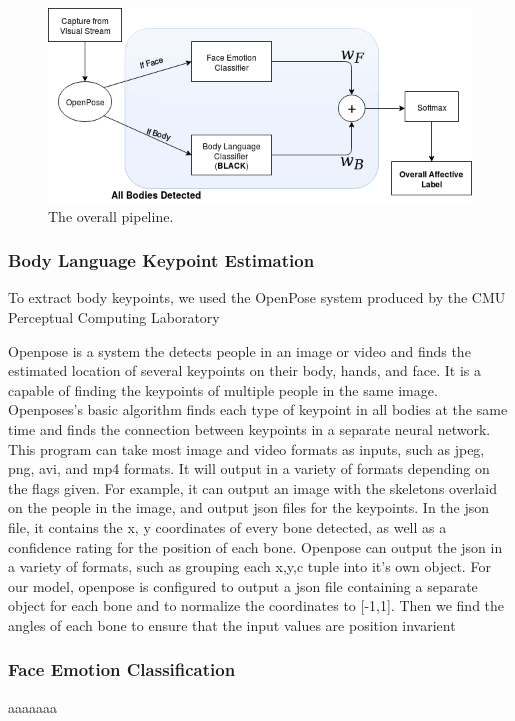 \documentclass{article}
\begin{document}
\begin{figure}[h]
	\centering
	\includegraphics[scale=0.5]{Pipeline}
	\caption{The overall pipeline.}
\end{figure}

\subsubsection{Body Language Keypoint Estimation}

To extract body keypoints, we used the OpenPose system produced by the CMU Perceptual Computing Laboratory \citep{cao2017realtime} \citep{simon2017hand} \citep{wei2016cpm}

Openpose is a system the detects people in an image or video and finds the estimated location of several keypoints on their body, hands, and face. It is a capable of finding the keypoints of multiple people in the same image. Openposes’s	 basic algorithm finds each type of keypoint in all bodies at the same time and finds the connection between keypoints in a separate neural network. This program can take most image and video formats as inputs, such as jpeg, png, avi, and mp4 formats. It will output in a variety of formats depending on the flags given. For example, it can output an image with the skeletons overlaid on the people in the image, and output json files for the keypoints. In the json file, it contains the x, y coordinates of every bone detected, as well as a confidence rating for the position of each bone. Openpose can output the json in a variety of formats, such as grouping each x,y,c tuple into it’s own object. For our model, openpose is configured to output a json file containing a separate object for each bone and to normalize the coordinates to [-1,1]. Then we find the angles of each bone to ensure that the input values are position invarient

\subsubsection{Face Emotion Classification}
aaaaaaa
\end{document}
